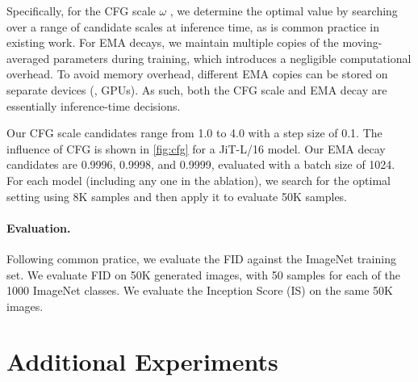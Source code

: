 Specifically, for the CFG scale $\omega$ \cite{ho2022classifier}, we determine the optimal value by searching over a range of candidate scales at inference time, as is common practice in existing work. For EMA decays, we maintain multiple copies of the moving-averaged parameters during training, which introduces a negligible computational overhead. To avoid memory overhead, different EMA copies can be stored on separate devices (\eg, GPUs). As such, both the CFG scale and EMA decay are essentially inference-time decisions.

Our CFG scale candidates range from 1.0 to 4.0 with a step size of 0.1. 
The influence of CFG is shown in \cref{fig:cfg} for a JiT-L/16 model.
Our EMA decay candidates are 0.9996, 0.9998, and 0.9999, evaluated with a batch size of 1024. 
For each model (including any one in the ablation), we search for the optimal setting using 8K samples and then apply it to evaluate 50K samples.

\paragraph{Evaluation.} Following common pratice, we evaluate the FID \cite{heusel2017gans} against the ImageNet training set. We evaluate FID on 50K generated images, with 50 samples for each of the 1000 ImageNet classes. We evaluate the Inception Score (IS) \cite{salimans2016improved} on the same 50K images.


\section{Additional Experiments}


